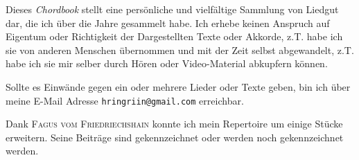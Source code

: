 \documentclass[landscape]{../TeX/Chordbook/chordbook}
\newcommand{\blankpage}{%
    \null
    \thispagestyle{empty}%
    \addtocounter{page}{-1}%
    \newpage}
\newcommand{\wpage}{\afterpage{\blankpage}}
\begin{document}

\date{\textbf{Erstellt am:} 10. Februar 2014 \\ \textbf{\"{U}berarbeitet am:} \today}
\clearpage


\maketitle \clearpage

\begin{center}
    { \Large
        \parbox{17cm}{
            Dieses \textit{Chordbook} stellt eine pers\"{o}nliche und vielf\"{a}ltige Sammlung von Liedgut dar, die ich \"{u}ber die Jahre gesammelt habe.
            Ich erhebe keinen Anspruch auf Eigentum oder Richtigkeit der Dargestellten Texte oder Akkorde, z.T. habe ich sie von anderen Menschen \"{u}bernommen und mit der Zeit selbst abgewandelt, z.T. habe ich sie mir selber durch H\"{o}ren oder Video-Material abkupfern k\"{o}nnen. \par\medskip

            Sollte es Einw\"{a}nde gegen ein oder mehrere Lieder oder Texte geben, bin ich \"{u}ber meine E-Mail Adresse \texttt{hringriin@gmail.com} erreichbar.

            Dank \textsc{Fagus vom Friedriechshain} konnte ich mein Repertoire um einige St\"{u}cke erweitern.
            Seine Beitr\"{a}ge sind gekennzeichnet oder werden noch gekennzeichnet werden.
        }
    }
\end{center}

\clearpage

\tableofcontents \clearpage

\columnsep=3mm

\renewcommand{\snumbgcolor}{songnr}
\renewcommand{\notebgcolor}{notes}
\renewcommand\printchord[1]{\footnotesize\sffamily\textit{\textcolor{linkcolor}{{#1}}}}


\end{document}
